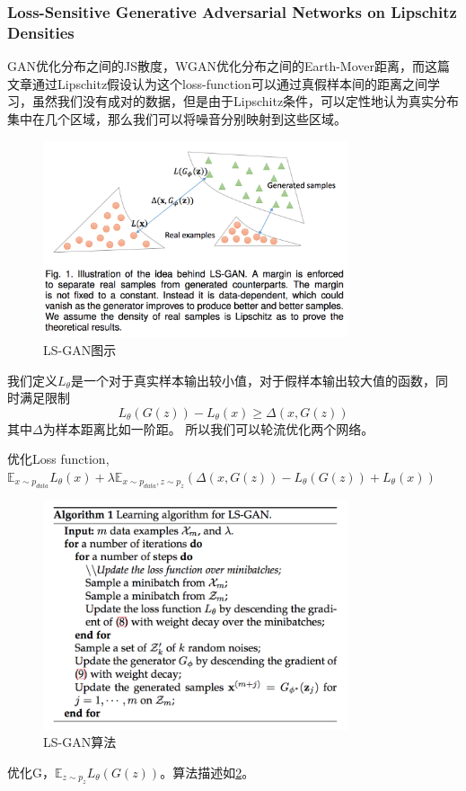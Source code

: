 \documentclass[a4paper]{article}
\begin{document}
\subsubsection{Loss-Sensitive Generative Adversarial Networks on Lipschitz Densities\cite{DBLP:journals/corr/Qi17}}
GAN优化分布之间的JS散度，WGAN优化分布之间的Earth-Mover距离，而这篇文章通过Lipschitz假设认为这个loss-function可以通过真假样本间的距离之间学习，虽然我们没有成对的数据，但是由于Lipschitz条件，可以定性地认为真实分布集中在几个区域，那么我们可以将噪音分别映射到这些区域。
\begin{figure}
\centering
\includegraphics[width=0.8\textwidth]{./img/30.png}
\caption{LS-GAN图示}
\label{fig:30}
\end{figure}
我们定义$L_\theta$是一个对于真实样本输出较小值，对于假样本输出较大值的函数，同时满足限制
$$L_\theta(G(z)) - L_\theta(x) \geq \Delta(x, G(z))$$其中$\Delta$为样本距离比如一阶距。
所以我们可以轮流优化两个网络。

优化Loss function,$\mathbb{E}_{x\sim p_{data}}L_\theta(x)+\lambda\mathbb{E}_{x\sim p_{data},z\sim p_z}(\Delta(x, G(z)) - L_\theta(G(z)) + L_\theta(x))$
\begin{figure}
\centering
\includegraphics[width=0.8\textwidth]{./img/31.png}
\caption{LS-GAN算法}
\label{fig:31}
\end{figure}
优化G，$\mathbb{E}_{z\sim p_z}L_\theta(G(z))$。算法描述如\ref{fig:31}。
\end{document}

